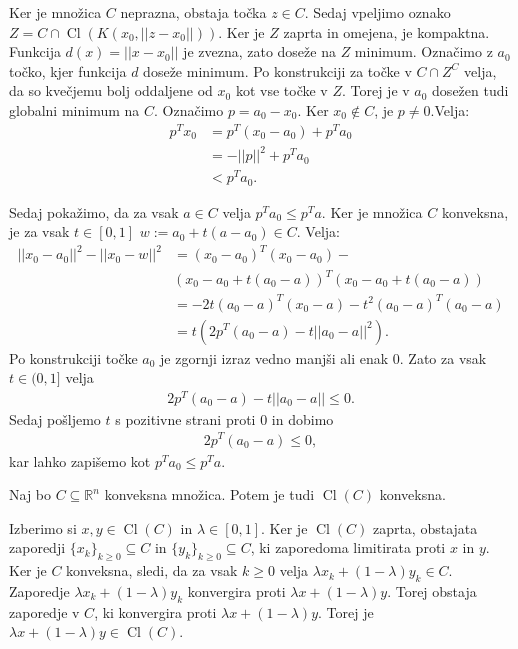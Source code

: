 \documentclass[mat1]{fmfdelo}
\newcommand{\R}{\mathbb R}
\DeclareMathOperator{\Cl}{Cl}
\begin{document}
\begin{dokaz}
	Ker je množica $C$ neprazna, obstaja točka $z\in C$. Sedaj vpeljimo oznako $Z = C \cap \Cl(K(x_0, ||z-x_0||))$. Ker je $Z$ zaprta in omejena,  je kompaktna. Funkcija $d(x) = ||x-x_0||$ je zvezna, zato doseže na $Z$ minimum. Označimo z $a_0$ točko, kjer funkcija $d$ doseže minimum. Po konstrukciji za točke v $C \cap Z^C$ velja, da so kvečjemu bolj oddaljene od $x_0$ kot vse točke v $Z$. Torej je v $a_0$ dosežen tudi globalni minimum na $C$. Označimo $p = a_0 - x_0.$ Ker $x_0 \notin C$, je $p \ne 0.$Velja: 
	\begin{align*}
	p^Tx_0 &= p^T(x_0 - a_0) + p^Ta_0\\
	&= -||p||^2 + p^Ta_0 \\
	&< p^Ta_0.
	\end{align*}
	
	
	Sedaj pokažimo, da za vsak $a\in C$ velja $p^Ta_0 \le p^Ta$. Ker je množica $C$ konveksna, je za vsak  $t \in [0,1]$ $w := a_0 + t(a-a_0)  \in C$. Velja:
	\begin{align*}
	||x_0 - a_0||^2  - ||x_0 - w||^2  &= (x_0 - a_0)^T(x_0 - a_0) -\\
	& (x_0 - a_0 + t(a_0-a))^T(x_0 - a_0 + t(a_0-a))\\
	&= -2t(a_0 - a)^T(x_0 - a) - t^2(a_0 - a)^T(a_0 - a) \\
	&= t (2p^T(a_0-a) - t||a_0-a||^2).
	\end{align*}
	Po konstrukciji točke $a_0$ je zgornji izraz vedno manjši ali enak $0$. Zato za vsak $t \in (0,1]$ velja
	\begin{align*}
	2p^T (a_0 - a )- t ||a_0-a|| \le 0.
	\end{align*}
	Sedaj pošljemo $t$ s pozitivne strani proti 0 in dobimo 
	\begin{align*}
	2p^T(a_0-a) \le  0,
	\end{align*}
	kar lahko zapišemo kot $p^Ta_0 \le p^Ta$.
\end{dokaz}

\begin{lema}\label{konveksnozaprtje}
	Naj bo $C \subseteq \R^n$ konveksna množica. Potem je tudi $\Cl(C)$ konveksna.
\end{lema}

\begin{dokaz}
	Izberimo si $x, y \in \Cl(C)$ in $\lambda \in [0,1]$. Ker je $\Cl(C)$ zaprta, obstajata zaporedji $\{x_k\}_{k\ge0} \subseteq C$ in $\{y_k\}_{k\ge0} \subseteq C$, ki zaporedoma limitirata proti $x$ in $y$. Ker je $C$ konveksna, sledi, da za vsak $k \ge 0$ velja $\lambda x_k + (1 - \lambda )y_k \in C$. Zaporedje $\lambda x_k + (1 - \lambda )y_k$ konvergira proti   $\lambda x + (1 - \lambda )y$. Torej obstaja zaporedje v $C$, ki konvergira proti $\lambda x + (1 - \lambda )y$. Torej je  $\lambda x + (1 - \lambda )y \in \Cl(C)$.
\end{dokaz}
\end{document}
